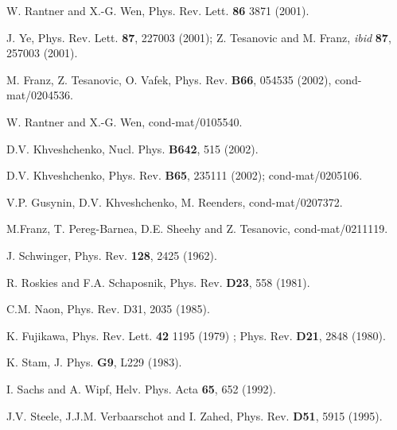 \documentclass[a4paper,12pt]{article}
\begin{document}
\begin{thebibliography}{99}

 W. Rantner and X.-G. Wen, Phys. Rev. Lett. {\bf 86} 3871 (2001).

 J. Ye, Phys. Rev. Lett. {\bf 87}, 227003 (2001); Z. Tesanovic and M. Franz, {\it ibid} {\bf 87}, 257003 (2001).

  M. Franz, Z. Tesanovic, O. Vafek,
Phys. Rev. {\bf B66}, 054535 (2002), cond-mat/0204536.

 W. Rantner and X.-G. Wen, cond-mat/0105540.

 D.V. Khveshchenko, Nucl. Phys. {\bf B642}, 515 (2002).

 D.V. Khveshchenko, Phys. Rev. {\bf B65}, 235111 (2002); cond-mat/0205106.

 V.P. Gusynin, D.V. Khveshchenko, M. Reenders, cond-mat/0207372.

 M.Franz, T. Pereg-Barnea, D.E. Sheehy and Z. Tesanovic, cond-mat/0211119.

 J. Schwinger, Phys. Rev. {\bf 128}, 2425 (1962).

 R. Roskies and F.A. Schaposnik, Phys. Rev. {\bf D23}, 558
(1981).

 C.M. Naon, Phys. Rev. {D31}, 2035 (1985). 

 K. Fujikawa, Phys. Rev. Lett. {\bf 42} 1195 (1979) ; Phys. Rev. {\bf D21}, 2848 (1980).

 K. Stam, J. Phys. {\bf G9}, L229 (1983).

 I. Sachs and A. Wipf, Helv. Phys. Acta {\bf 65}, 652 (1992).

 J.V. Steele, J.J.M. Verbaarschot and I. Zahed, Phys. Rev. {\bf D51}, 5915
(1995).

\end{thebibliography}
\end{document}
